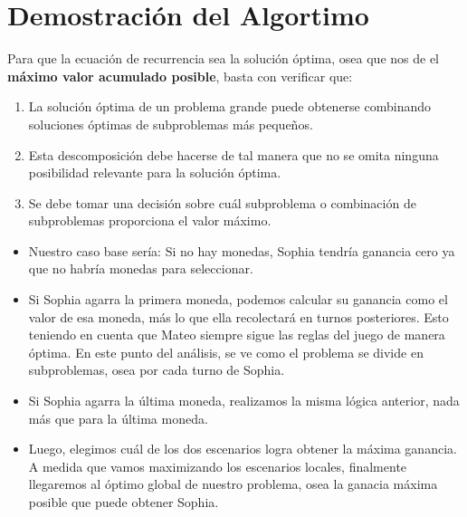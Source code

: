 \section{Demostración del Algortimo}

Para que la ecuación de recurrencia sea la solución óptima, osea que nos de el \textbf{máximo valor acumulado posible}, basta con verificar que:

\begin{enumerate}
    \item La solución óptima de un problema grande puede obtenerse combinando soluciones óptimas de subproblemas más pequeños.
    \item Esta descomposición debe hacerse de tal manera que no se omita ninguna posibilidad relevante para la solución óptima.
    \item Se debe tomar una decisión sobre cuál subproblema o combinación de subproblemas proporciona el valor máximo.
\end{enumerate}



\begin{itemize}
    \item Nuestro caso base sería: Si no hay monedas, Sophia tendría ganancia cero ya que no habría monedas para seleccionar.
    \item Si Sophia agarra la primera moneda, podemos calcular su ganancia como el valor de esa moneda, más lo que ella recolectará en turnos posteriores. Esto teniendo en cuenta
    que Mateo siempre sigue las reglas del juego de manera óptima. En este punto del análisis, se ve como el problema se divide en subproblemas, osea por cada turno de Sophia.
    \item Si Sophia agarra la última moneda, realizamos la misma lógica anterior, nada más que para la última moneda.
    \item Luego, elegimos cuál de los dos escenarios logra obtener la máxima ganancia. A medida que vamos maximizando los escenarios locales, finalmente llegaremos al óptimo global de nuestro problema, osea la ganacia máxima posible que puede obtener Sophia.
    \end{itemize}